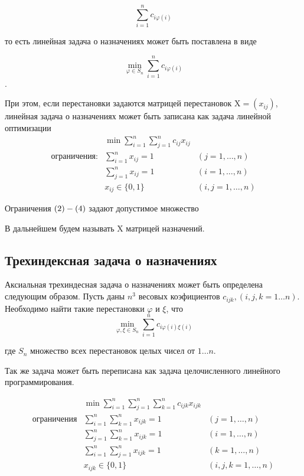 \[
  \sum^n_{i = 1} c_{i \varphi (i)}
\]

то есть линейная задача о назначениях может быть поставлена в виде

\[
  \min_{\varphi \in S_n} \sum^n_{i = 1} c_{i \varphi (i)}
\].

При этом, если перестановки задаются матрицей перестановок $\mathrm{X} = (x_{ij})$,
линейная задача о назначениях может быть записана как задача линейной оптимизации
\begin{align}
  & \min \displaystyle \sum^n_{i = 1} \displaystyle \sum^n_{j = 1} c_{ij} x_{ij} \\
  \text{ограничения:} & \displaystyle \sum^n_{i = 1} x_{ij} = 1 &(j = 1, \ldots, n) \\
  &\displaystyle \sum^n_{j = 1} x_{ij} = 1 &(i = 1, \ldots, n) \\
  & x_{ij} \in \{ 0, 1 \}
  &(i,j = 1, \ldots, n)
\end{align}

Ограничения  $(2) \-- (4)$ задают допустимое множество

В дальнейшем будем называть $\mathrm{X}$ матрицей назначений.

\subsection{Трехиндексная задача о назначениях}

Аксиальная трехиндесная задача о назначениях может быть определена следующим образом. 
Пусть даны $n^3$ весовых коэфициентов $c_{ijk}, (i,j,k=1 \ldots n)$. 
Необходимо найти такие перестановки $\varphi$ и $\xi$, что 
\[
  \min_{\varphi, \xi \in S_n} \sum^n_{i = 1} c_{i \varphi (i) \xi(i)}
\]

где $S_n$ множество всех перестановок целых чисел от $1 \ldots n$.

Так же задача может быть переписана как задача целочисленного линейного программирования. 

\begin{eqnarray*}
  & \min \displaystyle \sum^n_{i = 1} \displaystyle \sum^n_{j = 1} \displaystyle \sum^n_{k = 1}
  c_{ijk} x_{ijk} \\
  \text{ограничения}
  &\displaystyle \sum^n_{i = 1} \displaystyle \sum^n_{k = 1} x_{ijk} = 1  &(j = 1, \ldots, n) \\
  &\displaystyle \sum^n_{j = 1} \displaystyle \sum^n_{k = 1} x_{ijk} = 1  &(i = 1, \ldots, n) \\
  &\displaystyle \sum^n_{i = 1} \displaystyle \sum^n_{j = 1} x_{ijk} = 1  &(k = 1, \ldots, n) \\
  & x_{ijk} \in \{ 0, 1 \} &(i,j,k = 1, \ldots, n)
\end{eqnarray*}


